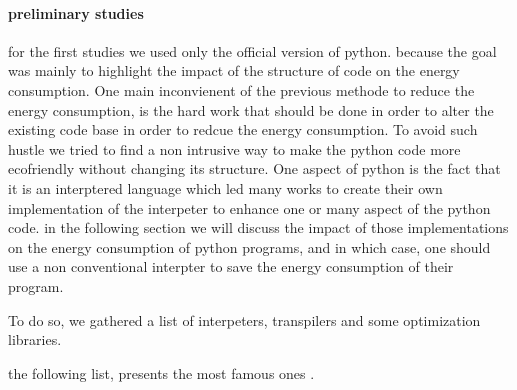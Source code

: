 \paragraph{preliminary studies}
for the first studies we used only the official version of python. because the goal was mainly to highlight the impact of the structure of code on the energy consumption.
One main inconvienent of the previous methode to reduce the energy consumption, is the hard work that should be done in order to alter the existing code base in order to redcue the energy consumption. To avoid such hustle we tried to find a non intrusive way to make the python code more ecofriendly without changing its structure. One aspect of python is the fact that it is an interptered language which led many works to create their own implementation of the interpeter to enhance one or many aspect of the python code. in the following section we will discuss the impact of those implementations on the energy consumption of python programs, and in which case, one should use a non conventional interpter to save the energy consumption of their program.

To do so, we gathered a list of interpeters, transpilers and some optimization libraries.

the following list, presents the most famous ones .

